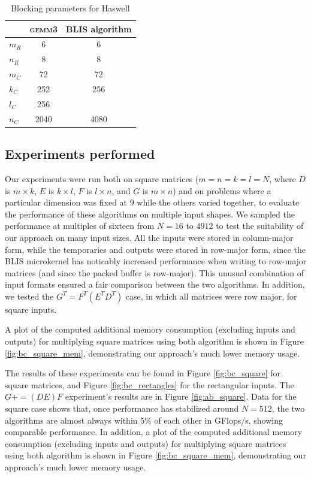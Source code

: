 \documentclass[12pt]{article}
\newcommand*{\pluseq}{\mathrel{{+}{=}}}
\newcommand*{\gemmt}{{\textsc{gemm3}}}
\begin{document}
\begin{table}
  \centering
  \begin{tabular}{l|c c}
    &\gemmt{}&BLIS algorithm\\ \hline
    $m_R$&6&6\\
    $n_R$&8&8\\
    $m_C$&72&72\\
    $k_C$&252&256\\
    $l_C$&256&\\
    $n_C$&2040&4080\\
  \end{tabular}
  \caption{Blocking parameters for Haswell}
  \label{tab:parameters}
\end{table}

\subsection{Experiments performed}
Our experiments were run both on square matrices ($m = n = k = l = N$, where $D$ is $m \times k$, $E$ is $k \times l$, $F$ is $l \times n$, and $G$ is $m \times n$) and on problems where a particular dimension was fixed at $9$ while the others varied together, to evaluate the performance of these algorithms on multiple input shapes.
We sampled the performance at multiples of sixteen from $N = 16$ to $4912$ to test the suitability of our approach on many input sizes.
All the inputs were stored in column-major form, while the temporaries and outputs were stored in row-major form, since the BLIS microkernel has noticably increased performance when writing to row-major matrices (and since the packed buffer is row-major).
This unusual combination of input formats ensured a fair comparison between the two algorithms.
In addition, we tested the $G^T = F^T(E^TD^T)$ case, in which all matrices were row major, for square inputs.

A plot of the computed additional memory consumption (excluding inputs and outputs) for multiplying square matrices using both algorithm is shown in Figure \ref{fig:bc_square_mem}, demonstrating our approach's much lower memory usage.

The results of these experiments can be found in Figure \ref{fig:bc_square} for square matrices, and Figure \ref{fig:bc_rectangles} for the rectangular inputs.
The $G \pluseq (DE)F$ experiment's results are in Figure \ref{fig:ab_square}.
Data for the square case shows that, once performance has stabilized around $N = 512$, the two algorithms are almost always within 5\% of each other in GFlops/s, showing comparable performance.
In addition, a plot of the computed additional memory consumption (excluding inputs and outputs) for multiplying square matrices using both algorithm is shown in Figure \ref{fig:bc_square_mem}, demonstrating our approach's much lower memory usage.
\end{document}
